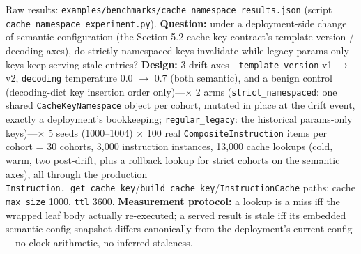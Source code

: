 \documentclass[
  11pt,
]{article}
\begin{document}
Raw results: \texttt{examples/benchmarks/cache\_namespace\_results.json}
(script \texttt{cache\_namespace\_experiment.py}). \textbf{Question:}
under a deployment-side change of semantic configuration (the Section
5.2 cache-key contract's template version / decoding axes), do strictly
namespaced keys invalidate while legacy params-only keys keep serving
stale entries? \textbf{Design:} 3 drift
axes---\texttt{template\_version} v1 \(\rightarrow\) v2,
\texttt{decoding} temperature 0.0 \(\rightarrow\) 0.7 (both semantic),
and a benign control (decoding-dict key insertion order
only)---\(\times\) 2 arms (\texttt{strict\_namespaced}: one shared
\texttt{CacheKeyNamespace} object per cohort, mutated in place at the
drift event, exactly a deployment's bookkeeping;
\texttt{regular\_legacy}: the historical params-only keys)---\(\times\)
5 seeds (1000--1004) \(\times\) 100 real \texttt{CompositeInstruction}
items per cohort = 30 cohorts, 3,000 instruction instances, 13,000 cache
lookups (cold, warm, two post-drift, plus a rollback lookup for strict
cohorts on the semantic axes), all through the production
\texttt{Instruction.\_get\_cache\_key}/\texttt{build\_cache\_key}/\texttt{InstructionCache}
paths; cache \texttt{max\_size} 1000, \texttt{ttl} 3600.
\textbf{Measurement protocol:} a lookup is a miss iff the wrapped leaf
body actually re-executed; a served result is stale iff its embedded
semantic-config snapshot differs canonically from the deployment's
current config---no clock arithmetic, no inferred staleness.
\end{document}
